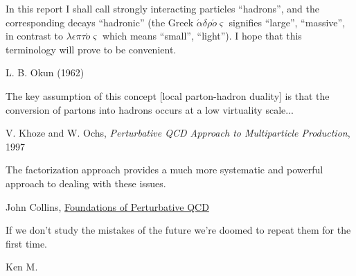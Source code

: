 \epigraph{
In this report I shall call strongly interacting particles ``hadrons'', and the corresponding decays ``hadronic'' (the Greek \(\acute{\alpha}\delta \rho \acute{o}\varsigma\) signifies ``large'', ``massive'', in contrast to \(\lambda \epsilon \pi \tau \acute{o} \varsigma\) which means ``small'', ``light''). I hope that this terminology will prove to be convenient.}{L. B. Okun (1962)}

\vspace{-15pt}

\epigraph{
    The key assumption of this concept [local parton-hadron duality] is that the conversion of partons into hadrons occurs at a low virtuality scale...
}
{V. Khoze and W. Ochs, \textit{Perturbative QCD Approach to Multiparticle Production}, 1997 \cite{Khoze:1996dn}}

\vspace{-15pt}


\epigraph{The factorization approach provides a much more systematic and powerful approach to dealing with these issues.}{John Collins, \underline{Foundations of Perturbative QCD} \cite{Collins:2011zzd}}


\vspace{-15pt}


\epigraph{If we don't study the mistakes of the future we're doomed to repeat them for the first time.}{Ken M.}

